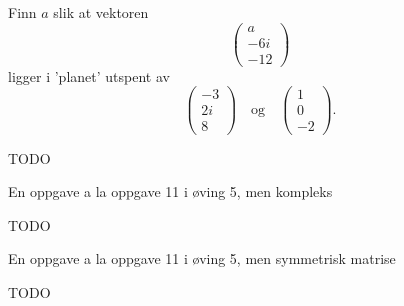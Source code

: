 \begin{oppgave}
Finn $a$ slik at vektoren 
\[
\begin{pmatrix}
a \\ -6i \\ -12 
\end{pmatrix}
\]
ligger i 'planet' utspent av 
\[
\begin{pmatrix}
-3 \\ 2i \\ 8 
\end{pmatrix}
\quad 
\text{og}
\quad 
\begin{pmatrix}
1 \\ 0 \\ -2 
\end{pmatrix}.
\]

\end{oppgave}

\begin{losning}
TODO
\end{losning}


\begin{oppgave}
En oppgave a la oppgave 11 i øving 5, men kompleks
\end{oppgave}

\begin{losning}
TODO
\end{losning}

\begin{oppgave}
En oppgave a la oppgave 11 i øving 5, men symmetrisk matrise
\end{oppgave}

\begin{losning}
TODO
\end{losning}


